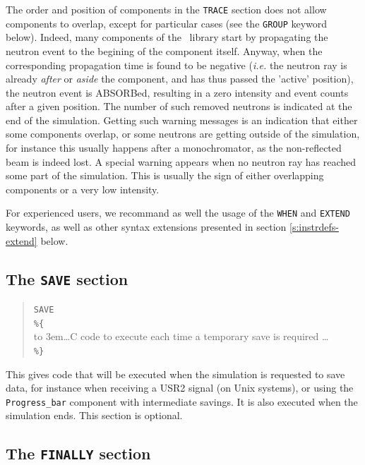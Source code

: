 The order and position of components in the \texttt{TRACE} section does not
allow components to overlap, except for particular cases (see the \texttt{GROUP} keyword below).
Indeed, many components of the \MCS\ library  start
by propagating the neutron event to the begining of the component itself.
Anyway, when the corresponding propagation time is found to be negative
({\it i.e.} the neutron ray is already \emph{after} or \emph{aside} the component, and has thus
passed the 'active' position), the neutron event is ABSORBed, resulting in a zero intensity and event counts after a given position. The number of such removed neutrons is indicated at the end of the simulation.
Getting such warning messages is an indication that either some
components overlap, or some neutrons are getting outside of the
simulation, for instance this usually happens after a monochromator,
as the non-reflected beam is indeed lost. A special warning appears
when no neutron ray has reached some part of the simulation. This is usually the sign of either overlapping components or a very low intensity. 

For experienced users, we recommand as well the usage of the \texttt{WHEN} and \texttt{EXTEND} keywords, as well as other syntax extensions presented in section \ref{s:instrdefs-extend} below.

\subsection{The \texttt{SAVE} section}
\label{s:save}

\begin{quote}
  \texttt{SAVE} \\
  \verb|%{| \\
  \hbox to 3em{}\ldots C code to execute each time a temporary save is required \ldots \\
  \verb|%}|
\end{quote} 
This gives code that will be executed when the simulation is requested to save data, for instance when receiving a USR2 signal (on Unix systems), or using the \verb+Progress_bar+ component with intermediate savings. It is also executed when the simulation ends. This section is optional.

\subsection{The \texttt{FINALLY} section}
\label{s:finally}

